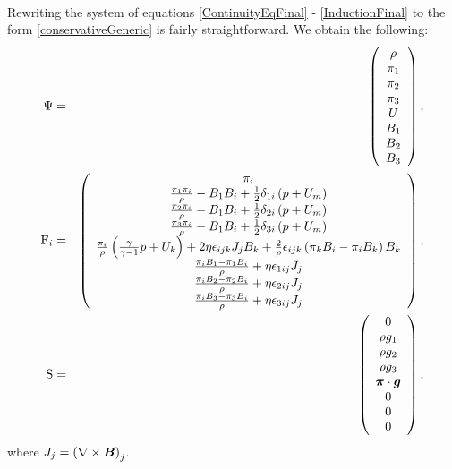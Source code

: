 \paragraph{}
Rewriting the system of equations \ref{ContinuityEqFinal} - \ref{InductionFinal} to the form \ref{conservativeGeneric} is fairly straightforward.
We obtain the following:
\begin{eqnarray}
\mathrm{\Psi} & = & \left(\begin{array}{c}\rho \\ \pi_1 \\ \pi_2 \\ \pi_3 \\ U \\ B_1 \\ B_2 \\ B_3 \\ \end{array}\right),\\\mathrm{F}_i & = & \left(\begin{array}{c} \pi_i \\ \frac{\pi_1 \pi_i}{\rho} - B_1 B_i + \frac12 \delta_{1i} \left( p + U_m\right) \\ \frac{\pi_2 \pi_i}{\rho} - B_1 B_i + \frac12 \delta_{2i} \left( p + U_m\right) \\ \frac{\pi_3 \pi_i}{\rho} - B_1 B_i + \frac12 \delta_{3i} \left( p + U_m\right) \\ \frac{\pi_i}{\rho} \left( \frac{\gamma}{\gamma - 1} p + U_k\right) + 2\eta\epsilon_{ijk} J_j B_k + \frac{2}{\rho} \epsilon_{ijk} \left( \pi_k B_i - \pi_i B_k\right) B_k  \\ \frac{\pi_i B_1 - \pi_1 B_i}{\rho} + \eta \epsilon_{1ij} J_j \\ \frac{\pi_i B_2 - \pi_2 B_i}{\rho} + \eta \epsilon_{2ij} J_j \\ \frac{\pi_i B_3 - \pi_3 B_i}{\rho} + \eta \epsilon_{3ij} J_j \\ \end{array}\right),\\
\mathrm{S} & = & \left(\begin{array}{c}0 \\ \rho g_1 \\ \rho g_2 \\ \rho g_3 \\ \mbox{\boldmath $\pi$} \cdot \mbox{\boldmath $g$} \\ 0 \\ 0 \\ 0 \\ \end{array}\right),
\end{eqnarray}
where $J_j = \left(\nabla\times\mbox{\boldmath $B$}\right)_j$.
